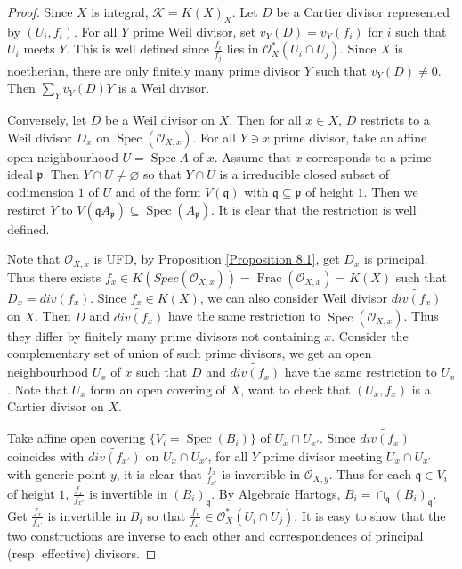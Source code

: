 \documentclass{ctexart}
\newcommand{\spec}{\operatorname{Spec}}
\newcommand{\fraction}{\operatorname{Frac}}
\begin{document}
\begin{proof}
    Since $X$ is integral, $\mathcal{K} = K(X)_{X}$.
    Let $D$ be a Cartier divisor represented by $(U_{i}, f_{i})$.
    For all $Y$ prime Weil divisor, set $v_{Y}(D) = v_{Y}(f_{i})$ for $i$ such that $U_{i}$ meets $Y$.
    This is well defined since $\frac{f_{i}}{f_{j}}$ lies in $\mathcal{O}_{X}^{\ast}(U_{i} \cap U_{j})$.
    Since $X$ is noetherian, there are only finitely many prime divisor $Y$ such that $v_{Y}(D) \neq 0$. 
    Then $\sum_{Y} v_{Y}(D)Y$ is a Weil divisor.
    \par
    Conversely, let $D$ be a Weil divisor on $X$.
    Then for all $x\in X$, $D$ restricts to a Weil divisor $D_{x}$ on $\spec(\mathcal{O}_{X, x})$.
    For all $Y\ni x$ prime divisor, take an affine open neighbourhood $U = \spec A$ of $x$.
    Assume that $x$ corresponds to a prime ideal $\mathfrak{p}$.
    Then $Y \cap U \neq \varnothing$ so that $Y \cap U$ is a irreducible closed subset of codimension $1$ of $U$ and of the form $V(\mathfrak{q})$ with $\mathfrak{q} \subseteq \mathfrak{p}$ of height $1$.
    Then we restirct $Y$ to $V(\mathfrak{q}A_{\mathfrak{p}}) \subseteq \spec(A_{\mathfrak{p}})$.
    It is clear that the restriction is well defined.
    \par
    Note that $\mathcal{O}_{X, x}$ is UFD, by Proposition \ref{Proposition 8.1}, get $D_{x}$ is principal.
    Thus there exists $f_{x}\in K(Spec(\mathcal{O}_{X, x})) = \fraction(\mathcal{O}_{X, x}) = K(X)$ such that $D_{x} = div(f_{x})$.
    Since $f_{x}\in K(X)$, we can also consider Weil divisor $\widetilde{div(f_{x})}$ on $X$.
    Then $D$ and $\widetilde{div(f_{x})}$ have the same restriction to $\spec(\mathcal{O}_{X, x})$.
    Thus they differ by finitely many prime divisors not containing $x$.
    Consider the complementary set of union of such prime divisors, we get an open neighbourhood $U_{x}$ of $x$ such that $D$ and $\widetilde{div(f_{x})}$ have the same restriction to $U_{x}$.
    Note that $U_{x}$ form an open covering of $X$, want to check that $(U_{x}, f_{x})$ is a Cartier divisor on $X$.
    \par
    Take affine open covering $\{V_{i} = \spec(B_{i})\}$ of $U_{x} \cap U_{x'}$.
    Since $\widetilde{div(f_{x})}$ coincides with $\widetilde{div(f_{x'})}$ on $U_{x} \cap U_{x'}$, 
    for all $Y$ prime divisor meeting $U_{x} \cap U_{x'}$ with generic point $y$, it is clear that $\frac{f_{x}}{f_{x'}}$ is invertible in $\mathcal{O}_{X, y}$.
    Thus for each $\mathfrak{q}\in V_{i}$ of height $1$, $\frac{f_{x}}{f_{x'}}$ is invertible in $(B_{i})_{\mathfrak{q}}$.
    By Algebraic Hartogs, $B_{i} = \cap_{\mathfrak{q}} (B_{i})_{\mathfrak{q}}$.
    Get $\frac{f_{x}}{f_{x'}}$ is invertible in $B_{i}$ so that $\frac{f_{x}}{f_{x'}}\in \mathcal{O}_{X}^{\ast}(U_{i} \cap U_{j})$.
    It is easy to show that the two constructions are inverse to each other and correspondences of principal (resp. effective) divisors.
\end{proof}
\end{document}
